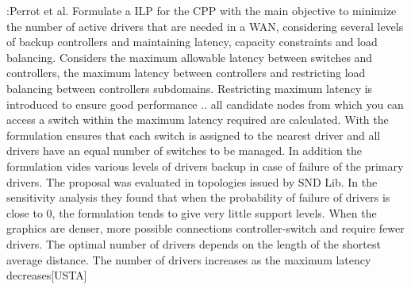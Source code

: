 \documentclass[a4paper,10pt]{article}
\begin{document}


\cite{PeRe16}:Perrot et al. Formulate a ILP for the CPP with the main objective to minimize the number of active drivers that are needed in a WAN, considering several levels of backup controllers and maintaining latency, capacity constraints and load balancing. Considers the maximum allowable latency between switches and controllers, the maximum latency between controllers and restricting load balancing between controllers subdomains. Restricting maximum latency is introduced to ensure good performance .. all candidate nodes from which you can access a switch within the maximum latency required are calculated. With the formulation ensures that each switch is assigned to the nearest driver and all drivers have an equal number of switches to be managed. In addition the formulation vides various levels of drivers backup in case of failure of the primary drivers.
The proposal was evaluated in topologies issued by SND Lib. In the sensitivity analysis they found that when the probability of failure of drivers is close to 0, the formulation tends to give very little support levels. When the graphics are denser, more possible connections controller-switch and require fewer drivers. The optimal number of drivers depends on the length of the shortest average distance. The number of drivers increases as the maximum latency decreases[USTA]
\end{document}
